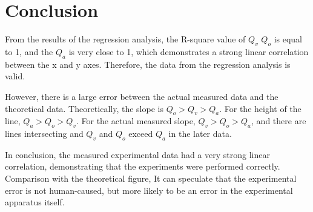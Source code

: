 \section{Conclusion}
\label{sec:conclusion}
From the results of the regression analysis, 
the R-square value of $Q_v$ $Q_o$ is equal to 1, and the $Q_a$ is very close to 1,
which demonstrates a strong linear correlation between the x and y axes.
Therefore, the data from the regression analysis is valid.

However, there is a large error between the actual measured data 
and the theoretical data. Theoretically, the slope is $Q_o>Q_v>Q_a$. For the height of the line, $Q_a>Q_o>Q_v$.
For the actual measured slope, $Q_v>Q_o>Q_a$, 
and there are lines intersecting and $Q_v$ and $Q_o$ exceed $Q_a$ in the later data.

In conclusion, the measured experimental data had a very strong linear correlation, 
demonstrating that the experiments were performed correctly.
Comparison with the theoretical figure, 
It can speculate that the experimental error is not human-caused, 
but more likely to be an error in the experimental apparatus itself.
